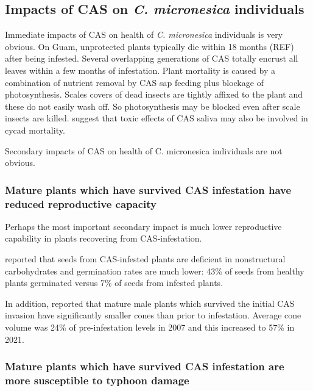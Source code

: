 \documentclass[12pt,letterpaper,english,bibliography=totocnumbered, abstract=on]{scrartcl}
\begin{document}
\subsection{Impacts of CAS on \textit{C. micronesica} individuals}

Immediate impacts of CAS on health of \textit{C. micronesica} individuals is very obvious. On Guam, unprotected plants typically die within 18 months (REF) after being infested. Several overlapping generations of CAS totally encrust all leaves within a few months of infestation. Plant mortality is caused by a combination of nutrient removal by CAS sap feeding plus blockage of photosynthesis. Scales covers of dead insects are tightly affixed to the plant and these do not easily wash off. So photosynthesis may be blocked even after scale insects are killed. \cite{muniappanCycadAulacaspisScale2012} suggest that toxic effects of CAS saliva may also be involved in cycad mortality. 


Secondary impacts of CAS on health of C. micronesica individuals are not obvious.

\subsubsection{Mature plants which have survived CAS infestation have reduced reproductive capacity}

Perhaps the most important secondary impact is much lower reproductive capability in plants recovering from CAS-infestation.  

\cite{marlerSourceSinkRelations2019} reported that seeds from CAS-infested plants are deficient in nonstructural carbohydrates  and germination rates are much lower: 43\% of seeds from healthy plants germinated versus 7\% of seeds from infested plants.

In addition, \cite{marlerAulacaspisYasumatsuiInvasion2021} reported that mature male plants which survived the initial CAS invasion have significantly smaller cones than prior to infestation. Average cone volume was 24\% of pre-infestation levels in 2007 and this increased to 57\% in 2021.

\subsubsection{Mature plants which have survived CAS infestation are more susceptible to typhoon damage}  
\end{document}

